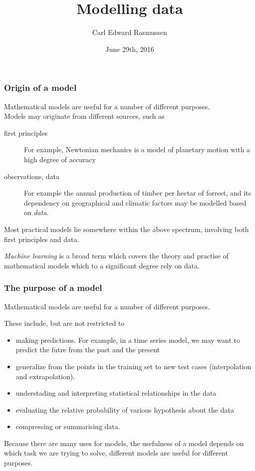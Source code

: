 

\title{Modelling data}
\author{Carl Edward Rasmussen}
\date{June 29th, 2016}



\begin{frame}
\titlepage
\end{frame}

\begin{frame}
\frametitle{Origin of a model}

Mathematical models are useful for a number of different purposes.\\

Models may originate from different sources, such as
\begin{description}
\item[first principles] For example, Newtonian mechanics is a model of planetary motion with a high degree of accuracy
\item[observations, data] For example the annual production of timber per hectar of forrest, and its dependency on geographical and climatic factors may be modelled based on \emph{data}.
\end{description}
Most practical models lie somewhere within the  above spectrum, involving both first principles and data.

\emph{Machine learning} is a broad term which covers the theory and practise of mathematical models which to a significant degree rely on data.  
\end{frame}


\begin{frame}
\frametitle{The purpose of a model}

Mathematical models are useful for a number of different purposes.

These include, but are not restricted to
\begin{itemize}
\item making predictions. For example, in a time series model, we may want to predict the futre from the past and the present
\item generalize from the points in the training set to new test cases (interpolation and extrapolation).
\item understading and interpreting statistical relationships in the data
\item evaluating the relative probability of various hypothesis about the data
\item compressing or summarising data.
\end{itemize}

Because there are many uses for models, the usefulness of a model depends on which task we are trying to solve, different models are useful for different purposes.
\end{frame}




